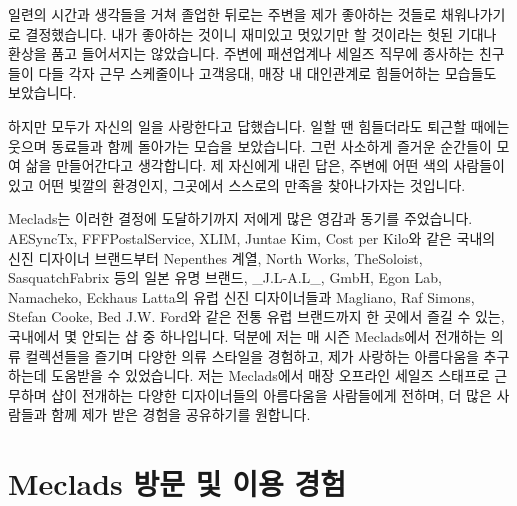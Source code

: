 일련의 시간과 생각들을 거쳐 졸업한 뒤로는 주변을 제가 좋아하는 것들로 채워나가기로 결정했습니다. 내가 좋아하는 것이니 재미있고 멋있기만 할 것이라는 헛된 기대나 환상을 품고 들어서지는 않았습니다. 주변에 패션업계나 세일즈 직무에 종사하는 친구들이 다들 각자 근무 스케줄이나 고객응대, 매장 내 대인관계로 힘들어하는 모습들도 보았습니다.

하지만 모두가 자신의 일을 사랑한다고 답했습니다. 일할 땐 힘들더라도 퇴근할 때에는 웃으며 동료들과 함께 돌아가는 모습을 보았습니다. 그런 사소하게 즐거운 순간들이 모여 삶을 만들어간다고 생각합니다. 제 자신에게 내린 답은, 주변에 어떤 색의 사람들이 있고 어떤 빛깔의 환경인지, 그곳에서 스스로의 만족을 찾아나가자는 것입니다.

Meclads는 이러한 결정에 도달하기까지 저에게 많은 영감과 동기를 주었습니다. AESyncTx, FFFPostalService, XLIM, Juntae Kim, Cost per Kilo와 같은 국내의 신진 디자이너 브랜드부터 Nepenthes 계열, North Works, TheSoloist, SasquatchFabrix 등의 일본 유명 브랜드, \_J.L-A.L\_, GmbH, Egon Lab, Namacheko, Eckhaus Latta의 유럽 신진 디자이너들과 Magliano, Raf Simons, Stefan Cooke, Bed J.W. Ford와 같은 전통 유럽 브랜드까지 한 곳에서 즐길 수 있는, 국내에서 몇 안되는 샵 중 하나입니다. 덕분에 저는 매 시즌 Meclads에서 전개하는 의류 컬렉션들을 즐기며 다양한 의류 스타일을 경험하고, 제가 사랑하는 아름다움을 추구하는데 도움받을 수 있었습니다. 저는 Meclads에서 매장 오프라인 세일즈 스태프로 근무하며 샵이 전개하는 다양한 디자이너들의 아름다움을 사람들에게 전하며, 더 많은 사람들과 함께 제가 받은 경험을 공유하기를 원합니다.

\section*{Meclads 방문 및 이용 경험}



